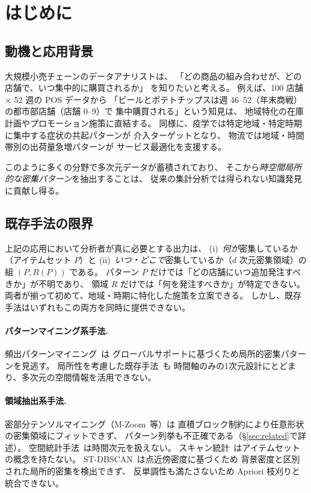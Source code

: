 \section{はじめに}\label{sec:intro}

\subsection{動機と応用背景}

大規模小売チェーンのデータアナリストは、
「どの商品の組み合わせが、どの店舗で、いつ集中的に購買されるか」
を知りたいと考える。
例えば、100 店舗 $\times$ 52 週の POS データから
「ビールとポテトチップスは週 46--52（年末商戦）の都市部店舗（店舗 0--9）で
集中購買される」という知見は、
地域特化の在庫計画やプロモーション施策に直結する。
同様に、疫学では特定地域・特定時期に集中する症状の共起パターンが
介入ターゲットとなり、
物流では地域・時間帯別の出荷量急増パターンが
サービス最適化を支援する。

このように多くの分野で多次元データが蓄積されており、
そこから\emph{時空間局所的な密集パターン}を抽出することは、
従来の集計分析では得られない知識発見に貢献し得る。

\subsection{既存手法の限界}

上記の応用において分析者が真に必要とする出力は、
(i)~\emph{何が}密集しているか（アイテムセット $P$）と
(ii)~\emph{いつ・どこで}密集しているか（$d$ 次元密集領域）の
組 $(P, R(P))$ である。
パターン $P$ だけでは「どの店舗にいつ追加発注すべきか」が不明であり、
領域 $R$ だけでは「何を発注すべきか」が特定できない。
両者が揃って初めて、地域・時期に特化した施策を立案できる。
しかし、既存手法はいずれもこの両方を同時に提供できない。

\paragraph{パターンマイニング系手法.}
頻出パターンマイニング~\cite{agrawal1994apriori,han2000mining}は
グローバルサポートに基づくため局所的密集パターンを見逃す。
局所性を考慮した既存手法~\cite{aprioriwindow}も
時間軸のみの1次元設計にとどまり、多次元の空間情報を活用できない。
\paragraph{領域抽出系手法.}
密部分テンソルマイニング（M-Zoom~\cite{shin2018mzoom}等）は
直積ブロック制約により任意形状の密集領域にフィットできず、
パターン列挙も不正確である（\S\ref{sec:related}で詳述）。
空間統計手法~\cite{anselin1995lisa,ord1995getis}は時間次元を扱えない。
スキャン統計~\cite{kulldorff1997spatial}はアイテムセットの概念を持たない。
ST-DBSCAN~\cite{birant2007stdbscan}は点近傍密度に基づくため
背景密度と区別された局所的密集を検出できず、
反単調性も満たさないため Apriori 枝刈りと統合できない。

